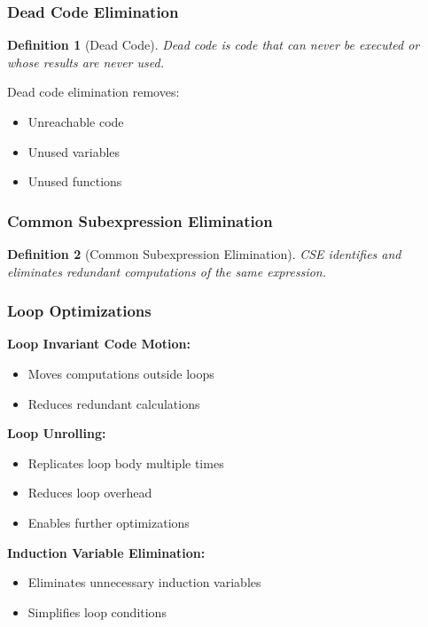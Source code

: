 \documentclass[11pt]{article}
\newtheorem{definition}{Definition}[section]
\begin{document}
\subsubsection{Dead Code Elimination}

\begin{definition}[Dead Code]
Dead code is code that can never be executed or whose results are never used.
\end{definition}

Dead code elimination removes:
\begin{itemize}
    \item Unreachable code
    \item Unused variables
    \item Unused functions
\end{itemize}

\subsubsection{Common Subexpression Elimination}

\begin{definition}[Common Subexpression Elimination]
CSE identifies and eliminates redundant computations of the same expression.
\end{definition}

\subsubsection{Loop Optimizations}

\textbf{Loop Invariant Code Motion:}
\begin{itemize}
    \item Moves computations outside loops
    \item Reduces redundant calculations
\end{itemize}

\textbf{Loop Unrolling:}
\begin{itemize}
    \item Replicates loop body multiple times
    \item Reduces loop overhead
    \item Enables further optimizations
\end{itemize}

\textbf{Induction Variable Elimination:}
\begin{itemize}
    \item Eliminates unnecessary induction variables
    \item Simplifies loop conditions
\end{itemize}
\end{document}
